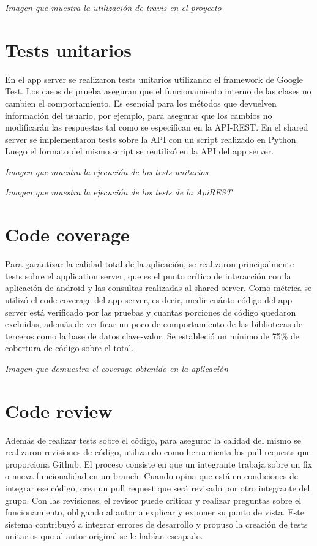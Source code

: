 \documentclass[letterpaper,10pt,spanish]{sphinxmanual}
\begin{document}
\noindent{}

\emph{Imagen que muestra la utilización de travis en el proyecto}


\section{Tests unitarios}
\label{manual:tests-unitarios}
En el app server se realizaron tests unitarios utilizando el framework de Google Test. Los casos de prueba aseguran que el funcionamiento interno de las clases no cambien el comportamiento. Es esencial para los métodos que devuelven información del usuario, por ejemplo, para asegurar que los cambios no modificarán las respuestas tal como se especifican en la API-REST.
En el shared server se implementaron tests sobre la API con un script realizado en Python. Luego el formato del mismo script se reutilizó en la API del app server.

\noindent{}

\emph{Imagen que muestra la ejecución de los tests unitarios}

\noindent{}

\emph{Imagen que muestra la ejecución de los tests de la ApiREST}


\section{Code coverage}
\label{manual:code-coverage}
Para garantizar la calidad total de la aplicación, se realizaron principalmente tests sobre el application server, que es el punto crítico de interacción con la aplicación de android y las consultas realizadas al shared server. Como métrica se utilizó el code coverage del app server, es decir, medir cuánto código del app server está verificado por las pruebas y cuantas porciones de código quedaron excluidas, además de verificar un poco de comportamiento de las bibliotecas de terceros como la base de datos clave-valor.
Se estableció un mínimo de 75\% de cobertura de código sobre el total.

\noindent{}

\emph{Imagen que demuestra el coverage obtenido en la aplicación}


\section{Code review}
\label{manual:code-review}
Además de realizar tests sobre el código, para asegurar la calidad del mismo se realizaron revisiones de código, utilizando como herramienta los pull requests que proporciona Github. El proceso consiste en que un integrante trabaja sobre un fix o nueva funcionalidad en un branch. Cuando opina que está en condiciones de integrar ese código, crea un pull request que será revisado por otro integrante del grupo. Con las revisiones, el revisor puede criticar y realizar preguntas sobre el funcionamiento, obligando al autor a explicar y exponer su punto de vista. Este sistema contribuyó a integrar errores de desarrollo y propuso la creación de tests unitarios que al autor original se le habían escapado.
\end{document}
